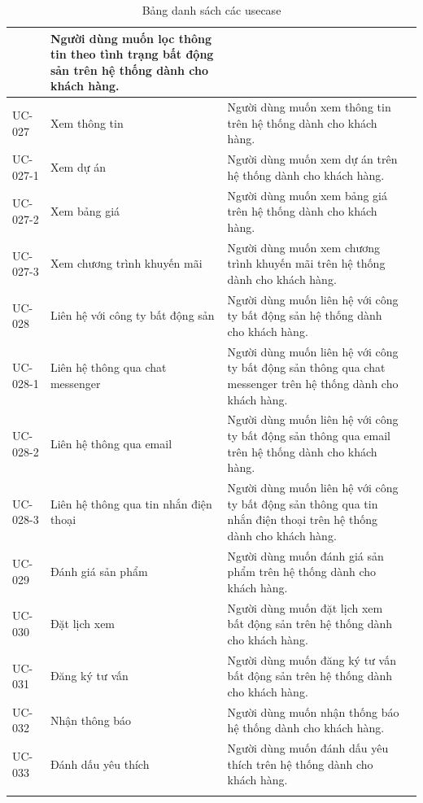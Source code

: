 \documentclass[12pt,a4paper]{article}
\begin{document}
\begin{center}
\begin{longtable}{|p{2.5cm}|p{4.5cm}|p{7.5cm}|c|}
            & Người dùng muốn lọc thông tin theo tình trạng bất động sản trên hệ thống dành cho khách hàng.
            \\ \hline
            UC-027
            & Xem thông tin
            & Người dùng muốn xem thông tin trên hệ thống dành cho khách hàng.
            \\ \hline
            UC-027-1
            & Xem dự án
            & Người dùng muốn xem dự án trên hệ thống dành cho khách hàng.
            \\ \hline
            UC-027-2
            & Xem bảng giá
            & Người dùng muốn xem bảng giá trên hệ thống dành cho khách hàng.
            \\ \hline
            UC-027-3
            & Xem chương trình khuyến mãi
            & Người dùng muốn xem chương trình khuyến mãi trên hệ thống dành cho khách hàng.
            \\ \hline
            UC-028
            & Liên hệ với công ty bất động sản
            & Người dùng muốn liên hệ với công ty bất động sản hệ thống dành cho khách hàng.
            \\ \hline
            UC-028-1
            & Liên hệ thông qua chat messenger
            & Người dùng muốn liên hệ với công ty bất động sản thông qua chat messenger trên hệ thống dành cho khách hàng.
            \\ \hline
            UC-028-2
            & Liên hệ thông qua email
            & Người dùng muốn liên hệ với công ty bất động sản thông qua email trên hệ thống dành cho khách hàng.
            \\ \hline
            UC-028-3
            & Liên hệ thông qua tin nhắn điện thoại
            & Người dùng muốn liên hệ với công ty bất động sản thông qua tin nhắn điện thoại trên hệ thống dành cho khách hàng.
            \\ \hline
            UC-029
            & Đánh giá sản phẩm
            & Người dùng muốn đánh giá sản phẩm trên hệ thống dành cho khách hàng.
            \\ \hline
            UC-030
            & Đặt lịch xem
            & Người dùng muốn đặt lịch xem bất động sản trên hệ thống dành cho khách hàng.
            \\ \hline
            UC-031
            & Đăng ký tư vấn
            & Người dùng muốn đăng ký tư vấn bất động sản trên hệ thống dành cho khách hàng.
            \\ \hline
            UC-032
            & Nhận thông báo
            & Người dùng muốn nhận thống báo hệ thống dành cho khách hàng.
            \\ \hline
            UC-033
            & Đánh dấu yêu thích
            & Người dùng muốn đánh dấu yêu thích trên hệ thống dành cho khách hàng.
            \\ \hline
            \caption{Bảng danh sách các usecase}
            \label{Bangusecases}
        \end{longtable}

    \end{center}
\end{document}
